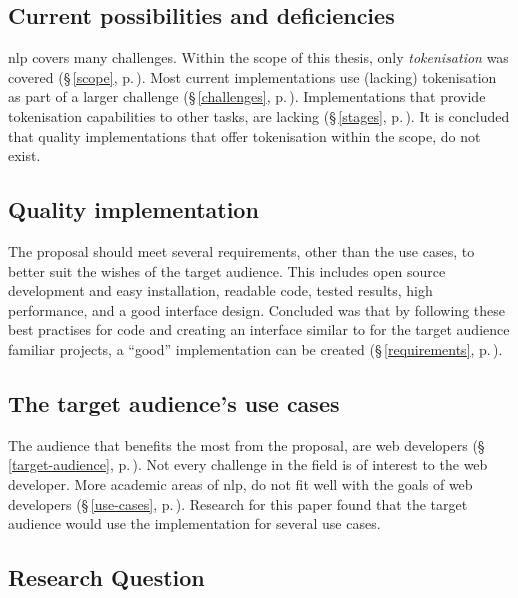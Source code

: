 \subsection{Current possibilities and
  deficiencies}\label{q-current-possibilities}

\gls{nlp} covers many challenges.
Within the scope of this thesis, only \emph{tokenisation} was covered
  (§\,\ref{scope}, p.\,\pageref{scope}).
Most current implementations use (lacking) tokenisation as part of a larger
  challenge (§\,\ref{challenges}, p.\,\pageref{challenges}).
Implementations that provide tokenisation capabilities to other tasks,
  are lacking (§\,\ref{stages}, p.\,\pageref{stages}).
It is concluded that quality implementations that offer tokenisation within
  the scope, do not exist.

\subsection{Quality implementation}\label{q-quality-implementation}

The proposal should meet several requirements, other than the use cases,
  to better suit the wishes of the target audience.
This includes open source development and easy installation, readable code,
  tested results, high performance, and a good interface design.
Concluded was that by following these best practises for code and creating
  an interface similar to for the target audience familiar projects, a
  ``good'' implementation can be created (§\,\ref{requirements},
  p.\,\pageref{requirements}).

\subsection{The target audience's use cases}\label{q-use-cases}

The audience that benefits the most from the proposal, are web developers
  (§\,\ref{target-audience}, p.\,\pageref{target-audience}).
Not every challenge in the field is of interest to the web developer.
More academic areas of \gls{nlp}, do not fit well with the goals of web
  developers (§\,\ref{use-cases}, p.\,\pageref{use-cases}).
Research for this paper found that the target audience would use the
  implementation for several use cases.

\subsection{Research Question}\label{q-research-question}

